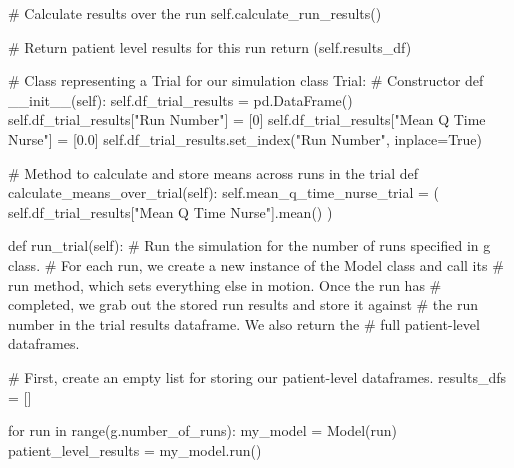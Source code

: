 \documentclass[
  letterpaper,
  DIV=11,
  numbers=noendperiod]{scrreprt}
\newenvironment{Shaded}{}{}
\newcommand{\BuiltInTok}[1]{\textcolor[rgb]{0.84,0.23,0.29}{#1}}
\newcommand{\CommentTok}[1]{\textcolor[rgb]{0.42,0.45,0.49}{#1}}
\newcommand{\ControlFlowTok}[1]{\textcolor[rgb]{0.84,0.23,0.29}{#1}}
\newcommand{\DecValTok}[1]{\textcolor[rgb]{0.00,0.36,0.77}{#1}}
\newcommand{\FloatTok}[1]{\textcolor[rgb]{0.00,0.36,0.77}{#1}}
\newcommand{\FunctionTok}[1]{\textcolor[rgb]{0.44,0.26,0.76}{#1}}
\newcommand{\KeywordTok}[1]{\textcolor[rgb]{0.84,0.23,0.29}{#1}}
\newcommand{\NormalTok}[1]{\textcolor[rgb]{0.14,0.16,0.18}{#1}}
\newcommand{\OperatorTok}[1]{\textcolor[rgb]{0.14,0.16,0.18}{#1}}
\newcommand{\StringTok}[1]{\textcolor[rgb]{0.01,0.18,0.38}{#1}}
\newcommand{\VariableTok}[1]{\textcolor[rgb]{0.89,0.38,0.04}{#1}}
\begin{document}
\begin{Shaded}
\begin{Highlighting}[]
        \CommentTok{\# Calculate results over the run}
        \VariableTok{self}\NormalTok{.calculate\_run\_results()}

        \CommentTok{\# Return patient level results for this run}
        \ControlFlowTok{return}\NormalTok{ (}\VariableTok{self}\NormalTok{.results\_df)}

\CommentTok{\# Class representing a Trial for our simulation}
\KeywordTok{class}\NormalTok{ Trial:}
    \CommentTok{\# Constructor}
    \KeywordTok{def}  \FunctionTok{\_\_init\_\_}\NormalTok{(}\VariableTok{self}\NormalTok{):}
        \VariableTok{self}\NormalTok{.df\_trial\_results }\OperatorTok{=}\NormalTok{ pd.DataFrame()}
        \VariableTok{self}\NormalTok{.df\_trial\_results[}\StringTok{"Run Number"}\NormalTok{] }\OperatorTok{=}\NormalTok{ [}\DecValTok{0}\NormalTok{]}
        \VariableTok{self}\NormalTok{.df\_trial\_results[}\StringTok{"Mean Q Time Nurse"}\NormalTok{] }\OperatorTok{=}\NormalTok{ [}\FloatTok{0.0}\NormalTok{]}
        \VariableTok{self}\NormalTok{.df\_trial\_results.set\_index(}\StringTok{"Run Number"}\NormalTok{, inplace}\OperatorTok{=}\VariableTok{True}\NormalTok{)}

    \CommentTok{\# Method to calculate and store means across runs in the trial}
    \KeywordTok{def}\NormalTok{ calculate\_means\_over\_trial(}\VariableTok{self}\NormalTok{):}
        \VariableTok{self}\NormalTok{.mean\_q\_time\_nurse\_trial }\OperatorTok{=}\NormalTok{ (}
            \VariableTok{self}\NormalTok{.df\_trial\_results[}\StringTok{"Mean Q Time Nurse"}\NormalTok{].mean()}
\NormalTok{        )}

    \KeywordTok{def}\NormalTok{ run\_trial(}\VariableTok{self}\NormalTok{):}
        \CommentTok{\# Run the simulation for the number of runs specified in g class.}
        \CommentTok{\# For each run, we create a new instance of the Model class and call its}
        \CommentTok{\# run method, which sets everything else in motion.  Once the run has}
        \CommentTok{\# completed, we grab out the stored run results and store it against}
        \CommentTok{\# the run number in the trial results dataframe. We also return the}
        \CommentTok{\# full patient{-}level dataframes.}

        \CommentTok{\# First, create an empty list for storing our patient{-}level dataframes.}
\NormalTok{        results\_dfs }\OperatorTok{=}\NormalTok{ []}

        \ControlFlowTok{for}\NormalTok{ run }\KeywordTok{in} \BuiltInTok{range}\NormalTok{(g.number\_of\_runs):}
\NormalTok{            my\_model }\OperatorTok{=}\NormalTok{ Model(run)}
\NormalTok{            patient\_level\_results }\OperatorTok{=}\NormalTok{ my\_model.run()}


\end{Highlighting}
\end{Shaded}
\end{document}

